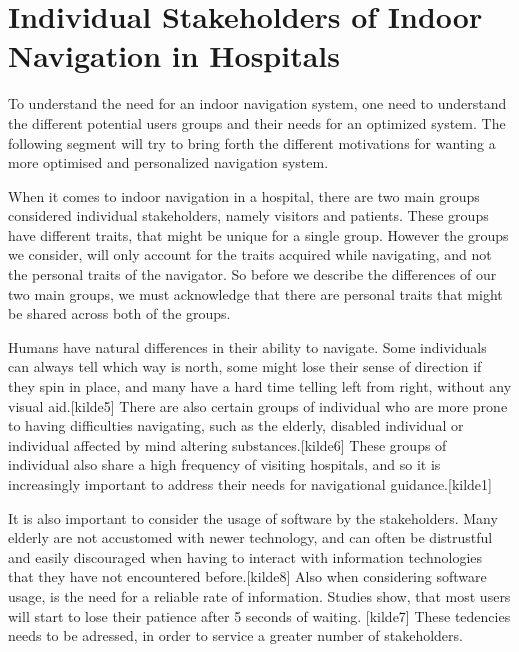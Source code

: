 \section{Individual Stakeholders of Indoor Navigation in Hospitals} %
\label{sec:interusers}


To understand the need for an indoor navigation system, one need to understand the different potential users groups and their needs for an optimized system. The following segment will try to bring forth the different motivations for wanting a more optimised and personalized navigation system.

When it comes to indoor navigation in a hospital, there are two main groups considered individual stakeholders, namely visitors and patients. These groups have different traits, that might be unique for a single group. However the groups we consider, will only account for the traits acquired while navigating, and not the personal traits of the navigator. So before we describe the differences of our two main groups, we must acknowledge that there are personal traits that might be shared across both of the groups.

Humans have natural differences in their ability to navigate. Some individuals can always tell which way is north, some might lose their sense of direction if they spin in place, and many have a hard time telling left from right, without any visual aid.[kilde5] There are also certain groups of individual who are more prone to having difficulties navigating, such as the elderly, disabled individual or individual affected by mind altering substances.[kilde6] These groups of individual also share a high frequency of visiting hospitals, and so it is increasingly important to address their needs for navigational guidance.[kilde1]

It is also important to consider the usage of software by the stakeholders. Many elderly are not accustomed with newer technology, and can often be distrustful and easily discouraged when having to interact with information technologies that they have not encountered before.[kilde8] Also when considering software usage, is the need for a reliable rate of information. Studies show, that most users will start to lose their patience after 5 seconds of waiting. [kilde7] These tedencies needs to be adressed, in order to service a greater number of stakeholders.

